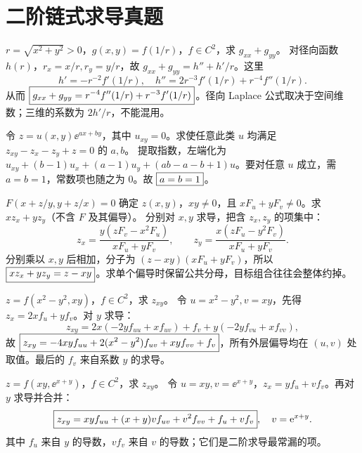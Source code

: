 
\section{二阶链式求导真题}
$r=\sqrt{x^2+y^2}>0$，$g(x,y)=f(1/r)$，$f\in C^2$，求 $g_{xx}+g_{yy}$。
\sol 对径向函数 $h(r)$，$r_x=x/r,r_y=y/r$，故 $g_{xx}+g_{yy}=h''+h'/r$。这里
\[h'=-r^{-2}f'(1/r),\quad h''=2r^{-3}f'(1/r)+r^{-4}f''(1/r).\]
从而 $\boxed{g_{xx}+g_{yy}=r^{-4}f''(1/r)+r^{-3}f'(1/r)}$。径向 Laplace 公式取决于空间维数；三维的系数为 $2h'/r$，不能混用。

令 $z=u(x,y)\ee^{ax+by}$，其中 $u_{xy}=0$。求使任意此类 $u$ 均满足 $z_{xy}-z_x-z_y+z=0$ 的 $a,b$。
\sol 提取指数，左端化为 $u_{xy}+(b-1)u_x+(a-1)u_y+(ab-a-b+1)u$。要对任意 $u$ 成立，需 $a=b=1$，常数项也随之为 0。故 $\boxed{a=b=1}$。

$F(x+z/y,y+z/x)=0$ 确定 $z(x,y)$，$xy\ne0$，且 $xF_u+yF_v\ne0$。求 $xz_x+yz_y$（不含 $F$ 及其偏导）。
\sol 分别对 $x,y$ 求导，把含 $z_x,z_y$ 的项集中：
\[
z_x=\frac{y(zF_v-x^2F_u)}{xF_u+yF_v},\qquad
z_y=\frac{x(zF_u-y^2F_v)}{xF_u+yF_v}.
\]
分别乘以 $x,y$ 后相加，分子为 $(z-xy)(xF_u+yF_v)$，所以 $\boxed{xz_x+yz_y=z-xy}$。求单个偏导时保留公共分母，目标组合往往会整体约掉。

$z=f(x^2-y^2,xy)$，$f\in C^2$，求 $z_{xy}$。
\sol 令 $u=x^2-y^2,v=xy$，先得 $z_x=2xf_u+yf_v$。对 $y$ 求导：
\[z_{xy}=2x(-2yf_{uu}+xf_{uv})+f_v+y(-2yf_{vu}+xf_{vv}),\]
故 $\boxed{z_{xy}=-4xyf_{uu}+2(x^2-y^2)f_{uv}+xyf_{vv}+f_v}$，所有外层偏导均在 $(u,v)$ 处取值。最后的 $f_v$ 来自系数 $y$ 的求导。

$z=f(xy,\ee^{x+y})$，$f\in C^2$，求 $z_{xy}$。
\sol 令 $u=xy,v=\ee^{x+y}$，$z_x=yf_u+vf_v$。再对 $y$ 求导并合并：
\[
\boxed{z_{xy}=xyf_{uu}+(x+y)vf_{uv}+v^2f_{vv}+f_u+vf_v},\quad v=\mathrm e^{x+y}.
\]
其中 $f_u$ 来自 $y$ 的导数，$vf_v$ 来自 $v$ 的导数；它们是二阶求导最常漏的项。

